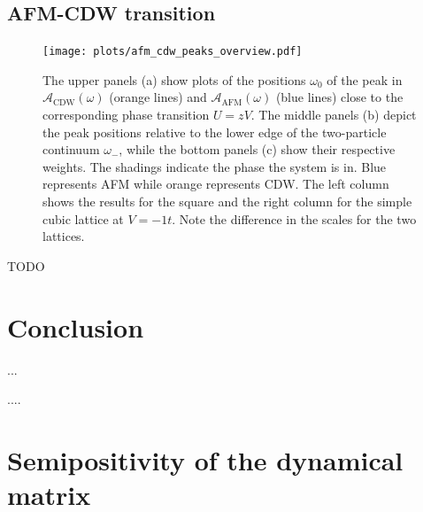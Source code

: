 \documentclass[
    reprint, 
    aps,
    preprintnumbers,
    twocolumn,
    prb,
    superscriptaddress
]{revtex4-2}
\newcommand{\spectral}[1]{\mathcal{A}_\text{#1}  (\omega)}
\begin{document}
\subsection{AFM-CDW transition}

\begin{figure}
    \centering
    \texttt{[image: plots/afm\_cdw\_peaks\_overview.pdf]}
    \caption{The upper panels (a) show plots of the positions $\omega_0$ of the peak in $\spectral{CDW}$ (orange lines) and $\spectral{AFM}$ (blue lines) close to the corresponding phase transition $U = zV$.
    The middle panels (b) depict the peak positions relative to the lower edge of the two-particle continuum $\omega_-$, while the bottom panels (c) show their respective weights.
    The shadings indicate the phase the system is in. Blue represents AFM while orange represents CDW.
    The left column shows the results for the square and the right column for the simple cubic lattice at $V=-1t$.
    Note the difference in the scales for the two lattices.}
    \label{fig:afm_cdw_peaks_overview}
\end{figure}

TODO


\section{Conclusion}\label{sec:conclusion}

...

\begin{acknowledgments} 
    ....
\end{acknowledgments}

\appendix
\section{Semipositivity of the dynamical matrix}
\label{sec:positive_M}
\end{document}
